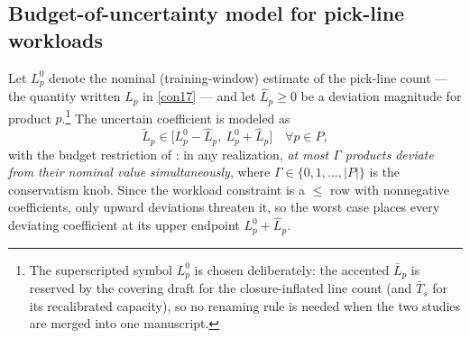 \subsection{Budget-of-uncertainty model for pick-line workloads}
\label{sec:budget}

Let $L^0_p$ denote the nominal (training-window) estimate of the pick-line
count --- the quantity written $L_p$ in \eqref{con17} --- and let
$\hat L_p \ge 0$ be a deviation magnitude for product
$p$.\footnote{The superscripted symbol $L^0_p$ is chosen deliberately: the
accented $\bar L_p$ is reserved by the covering draft for the
closure-inflated line count (and $\bar T_s$ for its recalibrated capacity),
so no renaming rule is needed when the two studies are merged into one
manuscript.} The uncertain coefficient is modeled as
\begin{equation}
\tilde L_p \in \bigl[L^0_p - \hat L_p,\ L^0_p + \hat L_p\bigr]
\quad \forall p \in P,
\label{eq:bs-uncset}
\end{equation}
with the budget restriction of \citet{bertsimas2004}: in any realization,
\emph{at most $\Gamma$
products deviate from their nominal value simultaneously}, where
$\Gamma \in \{0, 1, \dots, |P|\}$ is the conservatism knob. Since the workload
constraint is a $\le$ row with nonnegative coefficients, only upward
deviations threaten it, so the worst case places every deviating coefficient
at its upper endpoint $L^0_p + \hat L_p$.

